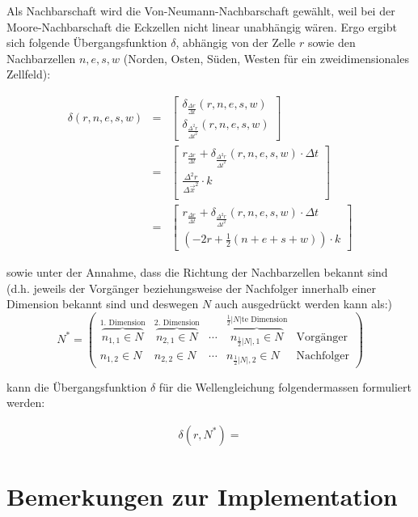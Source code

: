 \documentclass[11pt]{article} %
\theoremstyle{definition}
\begin{document}
Als Nachbarschaft wird die Von-Neumann-Nachbarschaft gewählt, weil bei der Moore-Nachbarschaft die Eckzellen nicht linear unabhängig wären. Ergo ergibt sich folgende Übergangsfunktion $\delta$, abhängig von der Zelle $r$ sowie den Nachbarzellen $n, e, s, w$ (Norden, Osten, Süden, Westen für ein zweidimensionales Zellfeld):

\begin{eqnarray*}
\delta(r, n, e, s, w) &=& \begin{bmatrix}
	\delta_{\frac {\Delta r}{\Delta t}}(r,n,e,s,w) \\
	\delta_{\frac {\Delta^2 r}{\Delta t^2}}(r,n,e,s,w)
\end{bmatrix} \\
&=& \begin{bmatrix}
	r_{\frac {\Delta r}{\Delta t}} + \delta_{\frac {\Delta^2 r}{\Delta t^2}}(r,n,e,s,w)  \cdot \Delta t \\
	\frac{\Delta^2 r}{\Delta \vec x^2} \cdot k  \\
\end{bmatrix} \\
&=& \begin{bmatrix}
	r_{\frac {\Delta r}{\Delta t}} + \delta_{\frac {\Delta^2 r}{\Delta t^2}}(r,n,e,s,w)  \cdot \Delta t \\
	(-2 r + \frac 1 2 (n + e + s + w)) \cdot k
\end{bmatrix}
\end{eqnarray*}

sowie unter der Annahme, dass die Richtung der Nachbarzellen bekannt sind (d.h. jeweils der Vorgänger beziehungsweise der Nachfolger innerhalb einer Dimension bekannt sind und deswegen $N$ auch ausgedrückt werden kann als:)
\[
N^* =\begin{pmatrix} \overbrace{n_{1,1} \in N}^{\textrm{1. Dimension}} & \overbrace{n_{2,1} \in N}^{\textrm{2. Dimension}} & \cdots & \overbrace{n_{\frac{1}{2}|N|, 1} \in N}^{\textrm{$\frac{1}{2}|N|$te Dimension}} & \textrm{Vorgänger} \\
n_{1,2} \in N & n_{2,2} \in N & \cdots & n_{\frac{1}{2}|N|, 2} \in N & \textrm{Nachfolger}
 \end{pmatrix}
\]

kann die Übergangsfunktion $\delta$ für die Wellengleichung folgendermassen formuliert werden:

\begin{eqnarray*}
\delta(r, N^*) = 
\end{eqnarray*}

\part{Bemerkungen zur Implementation}
\end{document}
